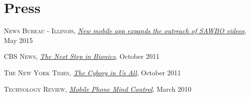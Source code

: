 
\section{\sc Press}
\textsc{News Bureau - Illinois}, \href{http://news.illinois.edu/news/15/0515SAWBO_app_BarryPittendrigh.html}{\emph{New mobile app expands the outreach of SAWBO videos}}, May 2015
\vspace*{-2.5mm}

\textsc{CBS News}, \href{http://www.cbsnews.com/stories/2011/10/09/sunday/main20117796.shtml}{\emph{The Next Step in Bionics}}, October 2011
\vspace*{-2.5mm}

\textsc{The New York Times}, \href{http://www.nytimes.com/2011/09/18/magazine/the-cyborg-in-us-all.html}{\emph{The Cyborg in Us All}}, October 2011
\vspace*{-2.5mm}

\textsc{Technology Review}, \href{http://www.technologyreview.com/blog/editors/24993/}{\emph{Mobile Phone Mind Control}}, March 2010
